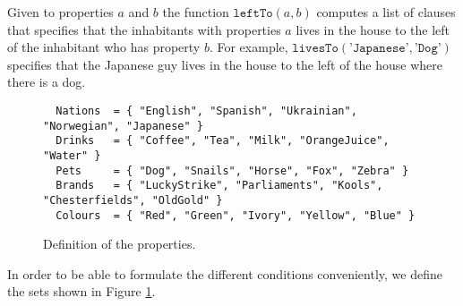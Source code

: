 Given to properties $a$ and $b$ the function $\texttt{leftTo}(a, b)$ computes a
list of clauses that specifies that the inhabitants with properties $a$ lives in
the house to the left of the inhabitant who has property $b$.  For example,
$\texttt{livesTo}(\texttt{'Japanese'}, \texttt{'Dog'})$ specifies that the
Japanese guy lives in the house to the left of the house where there is a dog.

\begin{figure}[!ht]
\centering
\begin{verbatim}
  Nations  = { "English", "Spanish", "Ukrainian", "Norwegian", "Japanese" }
  Drinks   = { "Coffee", "Tea", "Milk", "OrangeJuice", "Water" }
  Pets     = { "Dog", "Snails", "Horse", "Fox", "Zebra" }
  Brands   = { "LuckyStrike", "Parliaments", "Kools", "Chesterfields", "OldGold" }
  Colours  = { "Red", "Green", "Ivory", "Yellow", "Blue" }                
\end{verbatim}
\vspace*{-0.3cm}
\caption{Definition of the properties.}
\label{fig:properties}
\end{figure}

In order to be able to formulate the different conditions conveniently, we define the sets
shown in Figure \ref{fig:properties}.

